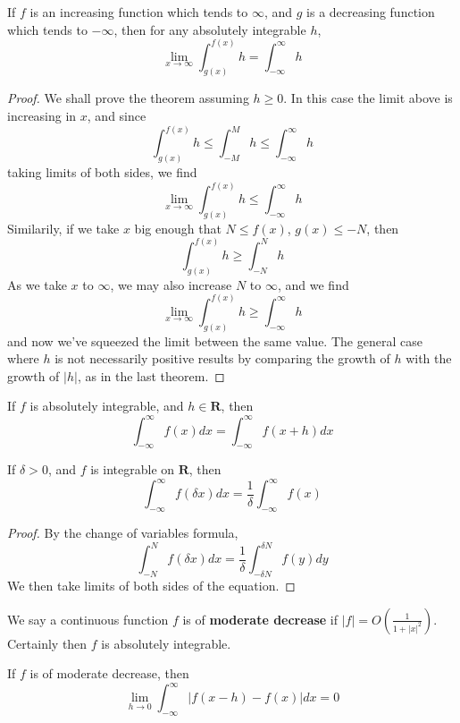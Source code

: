 \begin{lemma}
    If $f$ is an increasing function which tends to $\infty$, and $g$ is a decreasing function which tends to $-\infty$, then for any absolutely integrable $h$,
    \[ \lim_{x \to \infty} \int_{g(x)}^{f(x)} h = \int_{-\infty}^\infty h \]
\end{lemma}
\begin{proof}
    We shall prove the theorem assuming $h \geq 0$. In this case the limit above is increasing in $x$, and since
    \[ \int_{g(x)}^{f(x)} h \leq \int_{-M}^{M} h \leq \int_{-\infty}^\infty h \]
    taking limits of both sides, we find
    \[ \lim_{x \to \infty}  \int_{g(x)}^{f(x)} h \leq \int_{-\infty}^\infty h \] 
    Similarily, if we take $x$ big enough that $N \leq f(x)$, $g(x) \leq -N$, then
    \[ \int_{g(x)}^{f(x)} h \geq \int_{-N}^N h \]
    As we take $x$ to $\infty$, we may also increase $N$ to $\infty$, and we find
    \[ \lim_{x \to \infty} \int_{g(x)}^{f(x)} h \geq \int_{-\infty}^\infty h \]
    and now we've squeezed the limit between the same value. The general case where $h$ is not necessarily positive results by comparing the growth of $h$ with the growth of $|h|$, as in the last theorem.
\end{proof}

\begin{corollary}
    If $f$ is absolutely integrable, and $h \in \mathbf{R}$, then
    \[ \int_{-\infty}^\infty f(x) dx = \int_{-\infty}^\infty f(x + h) dx \]
\end{corollary}

\begin{lemma}
    If $\delta > 0$, and $f$ is integrable on $\mathbf{R}$, then
    \[ \int_{-\infty}^\infty f(\delta x) dx = \frac{1}{\delta} \int_{-\infty}^\infty f(x) \]
\end{lemma}
\begin{proof}
    By the change of variables formula,
    \[ \int_{-N}^N f(\delta x) dx = \frac{1}{\delta} \int_{-\delta N}^{\delta N} f(y) dy \]
    We then take limits of both sides of the equation.
\end{proof}

We say a continuous function $f$ is of {\bf moderate decrease} if $|f| = O \left(\frac{1}{1 + |x|^2} \right)$. Certainly then $f$ is absolutely integrable.

\begin{theorem}
    If $f$ is of moderate decrease, then
    \[ \lim_{h \to 0} \int_{-\infty}^\infty |f(x - h) - f(x)| dx = 0 \]
\end{theorem}

